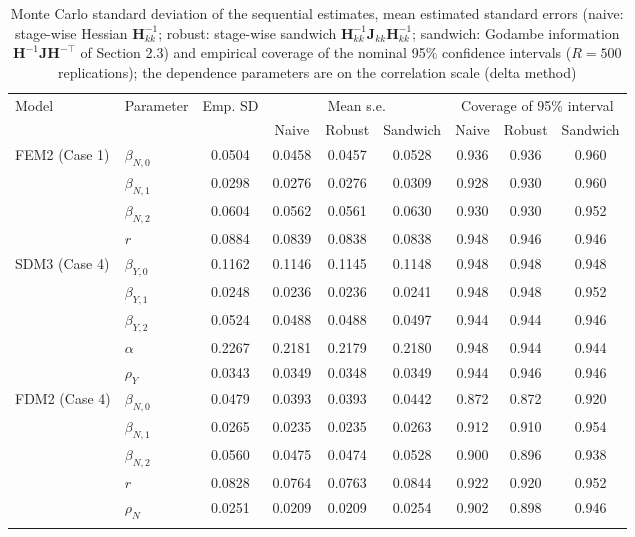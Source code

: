 \documentclass[11pt]{article}
\begin{document}
\begin{table}[!ht]
\footnotesize
\centering
{\color{blue}
\begin{tabular}{llccccccc}
\toprule
Model & Parameter & Emp. SD & \multicolumn{3}{c}{Mean s.e.} & \multicolumn{3}{c}{Coverage of 95\% interval} \\
\cmidrule(lr){4-6} \cmidrule(lr){7-9}
 & & & Naive & Robust & Sandwich & Naive & Robust & Sandwich \\
\midrule
FEM2 (Case 1) & $\beta_{N,0}$ & 0.0504 & 0.0458 & 0.0457 & 0.0528 & 0.936 & 0.936 & 0.960 \\
 & $\beta_{N,1}$ & 0.0298 & 0.0276 & 0.0276 & 0.0309 & 0.928 & 0.930 & 0.960 \\
 & $\beta_{N,2}$ & 0.0604 & 0.0562 & 0.0561 & 0.0630 & 0.930 & 0.930 & 0.952 \\
 & $r$ & 0.0884 & 0.0839 & 0.0838 & 0.0838 & 0.948 & 0.946 & 0.946 \\
\midrule
SDM3 (Case 4) & $\beta_{Y,0}$ & 0.1162 & 0.1146 & 0.1145 & 0.1148 & 0.948 & 0.948 & 0.948 \\
 & $\beta_{Y,1}$ & 0.0248 & 0.0236 & 0.0236 & 0.0241 & 0.948 & 0.948 & 0.952 \\
 & $\beta_{Y,2}$ & 0.0524 & 0.0488 & 0.0488 & 0.0497 & 0.944 & 0.944 & 0.946 \\
 & $\alpha$ & 0.2267 & 0.2181 & 0.2179 & 0.2180 & 0.948 & 0.944 & 0.944 \\
 & $\rho_Y$ & 0.0343 & 0.0349 & 0.0348 & 0.0349 & 0.944 & 0.946 & 0.946 \\
\midrule
FDM2 (Case 4) & $\beta_{N,0}$ & 0.0479 & 0.0393 & 0.0393 & 0.0442 & 0.872 & 0.872 & 0.920 \\
 & $\beta_{N,1}$ & 0.0265 & 0.0235 & 0.0235 & 0.0263 & 0.912 & 0.910 & 0.954 \\
 & $\beta_{N,2}$ & 0.0560 & 0.0475 & 0.0474 & 0.0528 & 0.900 & 0.896 & 0.938 \\
 & $r$ & 0.0828 & 0.0764 & 0.0763 & 0.0844 & 0.922 & 0.920 & 0.952 \\
 & $\rho_N$ & 0.0251 & 0.0209 & 0.0209 & 0.0254 & 0.902 & 0.898 & 0.946 \\
\hhline{=========}
\end{tabular}
}
\caption{Monte Carlo standard deviation of the sequential estimates, mean estimated standard errors (naive: stage-wise Hessian $\bm{H}_{kk}^{-1}$; robust: stage-wise sandwich $\bm{H}_{kk}^{-1}\bm{J}_{kk}\bm{H}_{kk}^{-1}$; sandwich: Godambe information $\bm{H}^{-1}\bm{J}\bm{H}^{-\top}$ of Section 2.3) and empirical coverage of the nominal 95\% confidence intervals ($R=500$ replications); the dependence parameters are on the correlation scale (delta method)}\label{tab:simcoverage}
\end{table}
\end{document}
